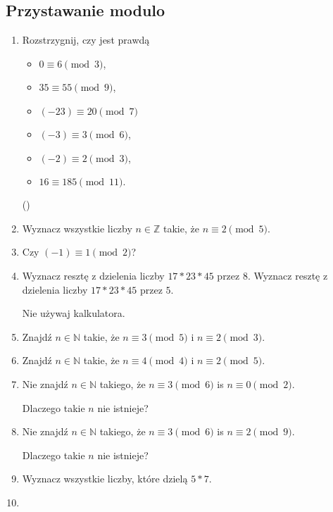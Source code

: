 \documentclass[12pt]{article}
\newcommand{\bbZ}{\mathbb{Z}}
\newcommand{\NN}{\mathbb{N}}
\begin{document}
\subsection{Przystawanie modulo}\label{subsec:modulo}
\begin{enumerate}
    \item Rozstrzygnij, czy jest prawdą
    \begin{itemize}
        \item
    $0 \equiv 6 \pmod 3$,
    \item
 $35 \equiv 55 \pmod 9$,
\item  $(-23) \equiv 20 \pmod 7$
 \item $(-3) \equiv 3 \pmod 6$,
 \item $(-2) \equiv 2 \pmod 3$,
 \item $16 \equiv 185 \pmod 11.$
 \end{itemize}
    (\cite[sec. 6.1, p. 154]{Forman.2015})



\item
Wyznacz wszystkie liczby $n\in \bbZ$ takie, że
$n\equiv 2 \pmod 5$.
\item 
Czy $(-1)\equiv 1 \pmod 2$?

\item Wyznacz resztę z dzielenia liczby $17*23*45$ przez $8$.
 Wyznacz resztę z dzielenia liczby $17*23*45$ przez $5$.

Nie używaj kalkulatora.

\item Znajdź $n\in \NN$ takie, że $n\equiv 3 \pmod 5$ i 
$n\equiv 2 \pmod 3$.

\item Znajdź $n\in \NN$ takie, że $n\equiv 4 \pmod 4$ i 
$n\equiv 2 \pmod 5$.

\item Nie znajdź $n\in \NN$ takiego, że
$n\equiv 3 \pmod 6$ is $n\equiv 0 \pmod 2$.

Dlaczego takie $n$ nie istnieje?

\item Nie znajdź $n\in \NN$ takiego, że
$n\equiv 3 \pmod 6$ is $n\equiv 2 \pmod 9$.

Dlaczego takie $n$ nie istnieje?

\item Wyznacz wszystkie liczby, które dzielą $5*7$. 
 

\item \label{exc:modpowers}


\end{enumerate}
\end{document}
